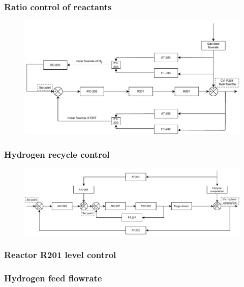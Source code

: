 \subsubsection{Ratio control of reactants} %
\begin{figure}[H]
    \centering
    \includegraphics[width=\linewidth]{chapters/4-operation-control/4-Figures/R201-FC.pdf}
    \caption{}
    \label{fig:R201-FC}
\end{figure} 

\subsubsection{Hydrogen recycle control}%
\begin{figure}[H]
    \centering
    \includegraphics[width=\linewidth]{chapters/4-operation-control/4-Figures/V202-CC.pdf}
    \caption{}
    \label{fig:V202-CC}
\end{figure}

\subsubsection{Reactor R201 level control} %


\subsubsection{Hydrogen feed flowrate} %








